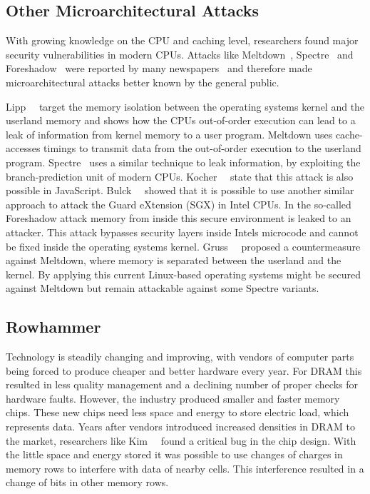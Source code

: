 \subsection{Other Microarchitectural Attacks}

With growing knowledge on the CPU and caching level, researchers found major
security vulnerabilities in modern CPUs. Attacks like Meltdown~\cite{meltdown},
Spectre~\cite{spectre} and Foreshadow~\cite{foreshadow} were reported by many
newspapers~\cite{bbcmeltdown, nbcmeltdown} and therefore made microarchitectural
attacks better known by the general public.

Lipp~\etal~\cite{meltdown} target the memory isolation between the operating
system\textquotesingle s kernel and the userland memory and shows how the
CPU\textquotesingle s out-of-order execution can lead to a leak of information
from kernel memory to a user program. Meltdown uses cache-accesses timings to
transmit data from the out-of-order execution to the userland program.
Spectre~\cite{spectre} uses a similar technique to leak information, by
exploiting the branch-prediction unit of modern CPUs.
Kocher~\etal~\cite{spectre} state that this attack is also possible in
JavaScript. Bulck~\etal~\cite{foreshadow} showed that it is possible to use
another similar approach to attack the Guard eXtension (SGX) in Intel CPUs. In
the so-called Foreshadow attack memory from inside this secure environment is
leaked to an attacker. This attack bypasses security layers inside
Intel\textquotesingle s microcode and cannot be fixed inside the operating
system\textquotesingle s kernel. Gruss~\etal~\cite{kaiserpaper} proposed a
countermeasure against Meltdown, where memory is separated between the userland
and the kernel. By applying this current Linux-based operating systems might be
secured against Meltdown but remain attackable against some Spectre variants.

\subsection{Rowhammer}

Technology is steadily changing and improving, with vendors of computer parts
being forced to produce cheaper and better hardware every year. For DRAM this
resulted in less quality management and a declining number of proper checks for
hardware faults. However, the industry produced smaller and faster memory chips.
These new chips need less space and energy to store electric load, which
represents data. Years after vendors introduced increased densities in DRAM to
the market, researchers like Kim~\etal~\cite{rowhammergeneral} found a critical
bug in the chip design. With the little space and energy stored it was possible
to use changes of charges in memory rows to interfere with data of nearby cells.
This interference resulted in a change of bits in other memory rows.


